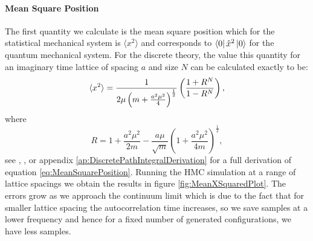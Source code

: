 \documentclass[12pt]{article}
\begin{document}
            \paragraph{Mean Square Position}
                The first quantity we calculate is the mean square position which for the statistical mechanical system is $\langle x^2 \rangle$ and corresponds to $\bra{0}\hat{x}^2\ket{0}$ for the quantum mechanical system. For the discrete theory, the value this quantity for an imaginary time lattice of spacing $a$ and size $N$ can be calculated exactly to be: 
                \begin{equation}
                    \label{eq:MeanSquarePosition}
                    \braket{x^2} = \frac{1}{2\mu\left(m+\frac{a^2\mu^2}{4}\right)^\frac{1}{2}}\left(\frac{1+R^N}{1-R^N}\right),
                \end{equation}
                where
                \begin{equation}
                    \label{eq:R}
                    R = 1 + \frac{a^2\mu^2}{2m} - \frac{a\mu}{\sqrt{m}}\left( 1 + \frac{a^2\mu^2}{4m}\right)^{\frac{1}{2}},
                \end{equation}
                see \cite{creutz_freedman_1981}, \cite{slapik_serenone}, \cite{westbroek_king_vvedensky_durr_2017} or appendix \ref{ap:DiscretePathIntegralDerivation} for a full derivation of equation \ref{eq:MeanSquarePosition}. Running the HMC simulation at a range of lattice spacings we obtain the results in figure \ref{fig:MeanXSquaredPlot}. The errors grow as we approach the continuum limit which is due to the fact that for smaller lattice spacing the autocorrelation time increases, so we save samples at a lower frequency and hence for a fixed number of generated configurations, we have less samples.
\end{document}
